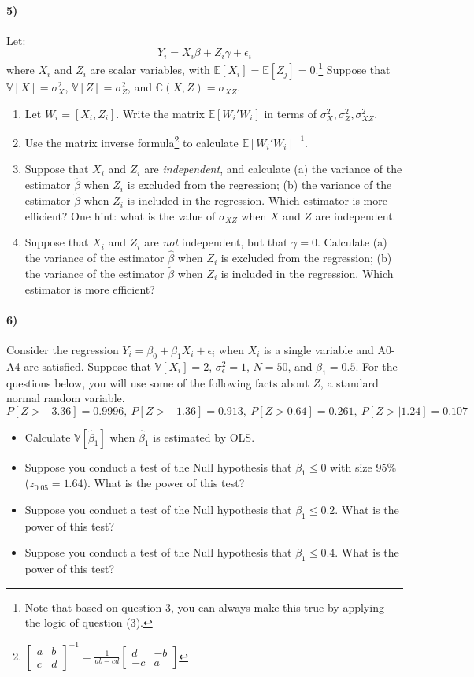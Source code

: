 \documentclass[12pt]{article}
\newcommand\BB{\mathbb}
\newcommand\EE{\mathbb{E}}
\newcommand\h{\hat}
\newcommand\eps{\epsilon}
\numberwithin{equation}{section}
\numberwithin{figure}{section}
\numberwithin{table}{section}
\begin{document}
\paragraph{5)} Let:
\[Y_i = X_i\beta + Z_i\gamma + \eps_i \]
where $X_i$ and $Z_i$ are scalar variables, with $\EE[X_i]=\EE[Z_j]=0$.\footnote{Note that based on question 3, you can always make this true by applying the logic of question (3).}
Suppose that $\BB{V}[X] = \sigma^2_X$, $\BB{V}[Z]=\sigma^2_Z$, and $\BB{C}(X,Z)=\sigma_{XZ}$.
\begin{enumerate}
\item Let $W_i=[X_i, Z_i]$. Write the matrix $\EE[W_i'W_i]$ in terms of $\sigma^2_X,\sigma^2_Z,\sigma^2_{XZ}$.
\item Use the matrix inverse formula\footnote{$\left[\begin{array}{cc}a & b \\c & d \end{array}\right]^{-1}=\frac{1}{ab-cd}\left[\begin{array}{cc}d & -b \\-c & a \end{array}\right]$} to calculate $\EE[W_i'W_i]^{-1}$.
\item Suppose that $X_i$ and $Z_i$ are \emph{independent}, and calculate (a) the variance of the estimator $\hat{\beta}$ when $Z_i$ is excluded from the regression; (b) the variance of the estimator $\tilde{\beta}$ when $Z_i$ is included in the regression. Which estimator is more efficient? One hint: what is the value of $\sigma_{XZ}$ when $X$ and $Z$ are independent.
\item Suppose that $X_i$ and $Z_i$ are \emph{not} independent, but that $\gamma=0$. Calculate (a) the variance of the estimator $\hat{\beta}$ when $Z_i$ is excluded from the regression; (b) the variance of the estimator $\tilde{\beta}$ when $Z_i$ is included in the regression. Which estimator is more efficient?
\end{enumerate}

\paragraph{6)} Consider the regression $Y_i = \beta_0 + \beta_1X_i + \eps_i$ when $X_i$ is a single variable and A0-A4 are satisfied. Suppose that $\BB{V}[X_i] = 2$, $\sigma^2_\eps=1$, $N=50$, and $\beta_1 = 0.5$.
For the questions below, you will use some of the following facts about $Z$, a standard normal random variable.
\[P[Z>-3.36] = 0.9996,\ P[Z>-1.36] = 0.913, \ P[Z>0.64] = 0.261,\ P[Z>|1.24] = 0.107 \]
\begin{itemize}
\item Calculate $\BB{V}[\h{\beta}_1]$ when $\h{\beta}_1$ is estimated by OLS.
\item Suppose you conduct a test of the Null hypothesis that $\beta_1\leq 0$ with size 95\% ($z_{0.05}=1.64$). What is the power of this test?
\item Suppose you conduct a test of the Null hypothesis that $\beta_1\leq 0.2$. What is the power of this test?
\item Suppose you conduct a test of the Null hypothesis that $\beta_1\leq 0.4$. What is the power of this test?
\end{itemize}
\end{document}
